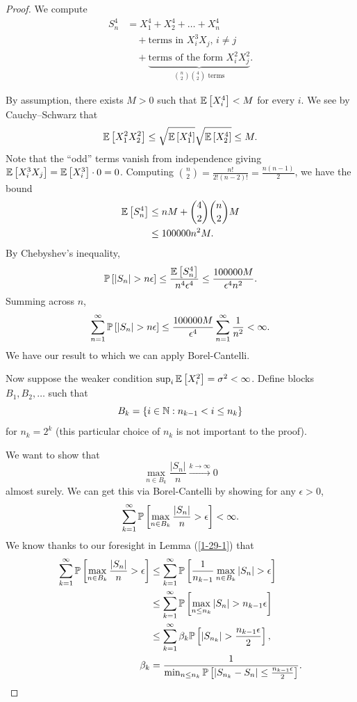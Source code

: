 \begin{proof}
	We compute
	\begin{align*}
		S_n^4
		&= X_1^4 + X_2^4 + \ldots+X_n^4 \\
		&\quad + \text{terms in $X_i^3X_j$, $i \ne j$} \\
		&\quad + \underbrace{\text{terms of the form } X_i^2X_j^2}_{\binom{n}{2}\binom{4}{2} \text{ terms}}
	.\end{align*}

	By assumption, there exists $M > 0$ such that $\E\left[X_i^4\right] < M$ for every $i$. We see by Cauchy--Schwarz that \[
		\E\left[X_1^2 X_2^2\right] \le \sqrt{\E\left[X_1^{4}\right] } \sqrt{\E\left[X_2^4\right] } \le M
		.\]
	Note that the ``odd'' terms vanish from independence giving $\E\left[X_i^3X_j\right] = \E\left[X_i^3\right] \cdot 0 = 0$.
	Computing $\binom{n}{2} = \frac{n!}{2! (n-2)!} = \frac{n(n-1)}{2}$, we have the bound
	\begin{align*}
		\E\left[S_n^{4}\right] &\le nM + \binom{4}{2}\binom{n}{2}M \\
							   &\le 100000 n^2 M
						   .\end{align*}
	By Chebyshev's inequality,
	\[
		\P\left[\left| S_n \right| > n \epsilon\right] \le \frac{\E\left[S_n^4\right] }{n^4\epsilon^4} \le \frac{100000 M}{\epsilon^4 n^2}
	.\]
	Summing across $n$,
	\[
		\sum\limits_{n=1}^{\infty} \P\left[\left| S_n \right| > n \epsilon\right] \le \frac{100000 M}{\epsilon^4} \sum\limits_{n=1}^{\infty} \frac{1}{n^2} < \infty
	.\]
	We have our result to which we can apply Borel-Cantelli.

	Now suppose the weaker condition $\sup_i \E\left[X_i^2\right] =\sigma^2< \infty$.
	Define blocks $B_1,B_2,\ldots$ such that \[
		B_k = \{i \in \N: n_{k-1} < i \le n_k\}
	\] for $n_k = 2^k$ (this particular choice of $n_k$ is not important to the proof).

	We want to show that \[
		\max_{n \in B_k} \frac{\left| S_n \right|}{n} \xrightarrow{k\to \infty} 0
	\] almost surely. We can get this via Borel-Cantelli by showing for any $\epsilon > 0$, \[
		\sum\limits_{k=1}^{\infty} \P\left[\max_{n \in B_k} \frac{\left| S_n \right|}{n} > \epsilon\right] < \infty
	.\] 
	We know thanks to our foresight in Lemma (\ref{1-29-1}) that
	\begin{align*}
		\sum\limits_{k=1}^{\infty} \P\left[\max_{n \in B_k} \frac{\left| S_n \right|}{n} > \epsilon\right] &\le \sum\limits_{k=1}^{\infty} \P\left[\frac{1}{n_{k-1}} \max_{n \in B_k} \left| S_n \right| > \epsilon\right] \\
				&\le \sum\limits_{k=1}^{\infty} \P\left[\max_{n \le n_k} \left| S_n \right| > n_{k-1}\epsilon\right] \\
					&\le \sum\limits_{k=1}^{\infty} \beta_k\P\left[\left| S_{n_k} \right|> \frac{n_{k-1}\epsilon}{2}\right], \\
					\beta_k &= \frac{1}{\min_{n \le n_k} \P\left[\left| S_{n_k}-S_n \right| \le \frac{n_{k-1}\epsilon}{2}\right] }
	.\end{align*}


\end{proof}
